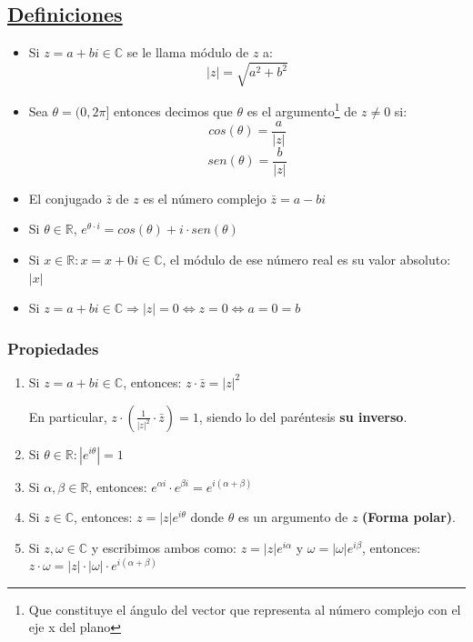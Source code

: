 \documentclass[10pt,a4paper,openright]{book}
\theoremstyle{break}
\begin{document}
\subsection{\underline{Definiciones}}
\begin{itemize}
\item Si $z=a+bi\in \mathbb C$ se le llama módulo de $z$ a:
$$|z|=\sqrt{a^2+b^2}$$

\item Sea $\theta=(0,2\pi]$ entonces decimos que $\theta$ es el argumento\footnote{Que constituye el ángulo del vector que representa al número complejo con el eje x del plano} de $z\neq 0$ si:
$$cos(\theta)=\frac{a}{|z|}$$
$$sen(\theta)=\frac{b}{|z|}$$

\item El conjugado $\bar{z}$ de $z$ es el número complejo $\bar{z}=a-bi$

\item Si $\theta \in \mathbb R$, $e^{\theta\cdot i}=cos(\theta)+i\cdot sen(\theta)$

\item Si $x\in \mathbb R : x= x+0i\in \mathbb C$, el módulo de ese número real es su valor absoluto: $|x|$

\item Si $z=a+bi\in \mathbb C\Rightarrow |z|=0\Leftrightarrow z=0\Leftrightarrow a=0=b$
\end{itemize}

\subsubsection{Propiedades}
\begin{enumerate}
\item Si $z=a+bi\in \mathbb C$, entonces: $z\cdot \bar{z}=|z|^2$\par
En particular, $z\cdot (\frac{1}{|z|^2}\cdot \bar{z})=1$, siendo lo del paréntesis \textbf{su inverso}.

\item Si $\theta\in \mathbb R: |e^{i\theta}|=1$

\item Si $\alpha, \beta \in \mathbb R$, entonces: $e^{\alpha i}\cdot e^{\beta i}=e^{i(\alpha +\beta)}$

\item Si $z\in \mathbb C$, entonces: $z=|z|e^{i\theta}$ donde $\theta$ es un argumento de $z$ \textbf{(Forma polar)}.

\item Si $z, \omega \in \mathbb C$ y escribimos ambos como: $z=|z|e^{i\alpha}$ y $\omega=|\omega|e^{i\beta}$, entonces: $z\cdot \omega=|z|\cdot |\omega|\cdot e^{i(\alpha +\beta)}$\par
\end{enumerate}
\end{document}
